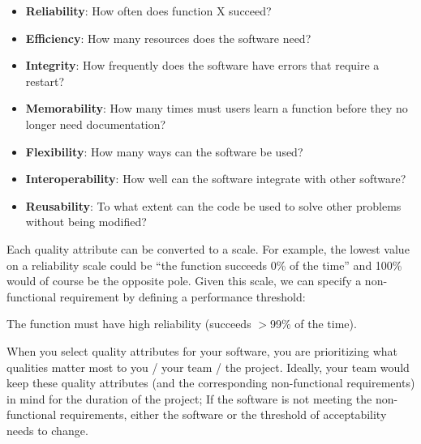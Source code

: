 \begin{itemize}
\item \textbf{Reliability}: How often does function X succeed?
\item \textbf{Efficiency}: How many resources does the software need?
\item \textbf{Integrity}: How frequently does the software have errors that require a restart?
\item \textbf{Memorability}: How many times must users learn a function before they no longer need documentation? 
\item \textbf{Flexibility}: How many ways can the software be used?
\item \textbf{Interoperability}: How well can the software integrate with other software?
\item \textbf{Reusability}: To what extent can the code be used to solve other problems without being modified?\\
\end{itemize}

Each quality attribute can be converted to a scale. For example, the lowest value on a reliability scale could be ``the function succeeds 0\% of the time'' and 100\% would of course be the opposite pole. Given this scale, we can specify a non-functional requirement by defining a performance threshold:

\begin{displayquote}
The function must have high reliability (succeeds $>$99\% of the time).
\end{displayquote}

When you select quality attributes for your software, you are prioritizing what qualities matter most to you / your team / the project. Ideally, your team would keep these quality attributes (and the corresponding non-functional requirements) in mind for the duration of the project; If the software is not meeting the non-functional requirements, either the software or the threshold of acceptability needs to change.

